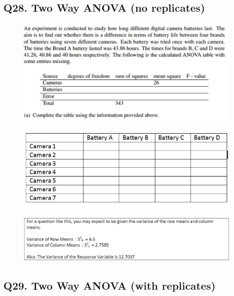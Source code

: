 \documentclass[a4paper,12pt]{article}
\begin{document}
\subsection*{Q28. Two Way ANOVA (no replicates)}
\begin{figure}[h!]
	\centering
	\includegraphics[width=0.9\linewidth]{images/Q28Review1}
	
\end{figure}
\begin{figure}[h!]
	\centering
	\includegraphics[width=0.9\linewidth]{images/Q28Review3}
	
\end{figure}
\begin{figure}[h!]
	\centering
	\includegraphics[width=0.9\linewidth]{images/Q28Review2}
	
\end{figure}
\newpage
\subsection*{Q29. Two Way ANOVA (with replicates)}
\end{document}
